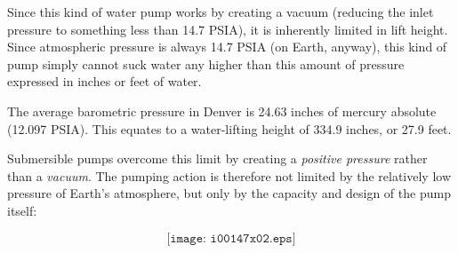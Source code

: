 Since this kind of water pump works by creating a vacuum (reducing the inlet pressure to something less than 14.7 PSIA), it is inherently limited in lift height.  Since atmospheric pressure is always 14.7 PSIA (on Earth, anyway), this kind of pump simply cannot suck water any higher than this amount of pressure expressed in inches or feet of water.

\vskip 10pt

The average barometric pressure in Denver is 24.63 inches of mercury absolute (12.097 PSIA).  This equates to a water-lifting height of 334.9 inches, or 27.9 feet.

\vskip 10pt

Submersible pumps overcome this limit by creating a {\it positive pressure} rather than a {\it vacuum}.  The pumping action is therefore not limited by the relatively low pressure of Earth's atmosphere, but only by the capacity and design of the pump itself:

$$\texttt{[image: i00147x02.eps]}$$











